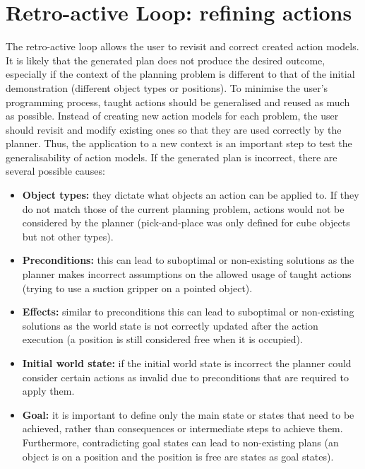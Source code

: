 \section{Retro-active Loop: refining actions}
The retro-active loop allows the user to revisit and correct created action models.
It is likely that the generated plan does not produce the desired outcome, especially if the context of the planning problem is different to that of the initial demonstration (\eg different object types or positions).
To minimise the user's programming process, taught actions should be generalised and reused as much as possible.
Instead of creating new action models for each problem, the user should revisit and modify existing ones so that they are used correctly by the planner.
Thus, the application to a new context is an important step to test the generalisability of action models.
If the generated plan is incorrect, there are several possible causes:
\begin{itemize}
	\item \textbf{Object types:} they dictate what objects an action can be applied to. If they do not match those of the current planning problem, actions would not be considered by the planner (\eg pick-and-place was only defined for cube objects but not other types).
	\item \textbf{Preconditions:} this can lead to suboptimal or non-existing solutions as the planner makes incorrect assumptions on the allowed usage of taught actions (\eg trying to use a suction gripper on a pointed object).
	\item \textbf{Effects:} similar to preconditions this can lead to suboptimal or non-existing solutions as the world state is not correctly updated after the action execution (\eg a position is still considered free when it is occupied).
	\item \textbf{Initial world state:} if the initial world state is incorrect the planner could consider certain actions as invalid due to preconditions that are required to apply them.
	\item \textbf{Goal:} it is important to define only the main state or states that need to be achieved, rather than consequences or intermediate steps to achieve them. Furthermore, contradicting goal states can lead to non-existing plans (\eg an object is on a position and the position is free are states as goal states).
\end{itemize}


